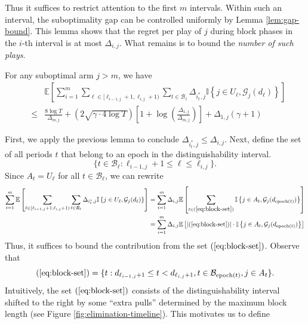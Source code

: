 \documentclass[opre,blindrev]{informs3}
\newcommand{\epoch}{\operatorname{epoch}}
\newcommand{\ind}[1]{\mathbb{I}\left\{#1\right\}}
\newcommand{\bE}[1]{{\mathbb{E}\left[#1\right]}}
\begin{document}
\begin{APPENDICES}
Thus it suffices to restrict attention to the first \(m\) intervals. 
Within such an interval, the suboptimality gap can be controlled uniformly by Lemma \ref{lem:gap-bound}. This lemma shows that the regret per play of \(j\) during block phases in the \(i\)-th interval is at most \(\Delta_{i,j}\). 
What remains is to bound the \emph{number of such plays}. 

\begin{lemma}\label{lem:B-final}
    For any suboptimal arm \(j > m\), we have
    \begin{eqnarray*}
        &&\bE{\sum_{i=1}^m \sum_{\ell \in [\ell_{i-1,j}+1, \ell_{i,j}+1)}\sum_{t \in \mathcal{B}_\ell}\Delta_{i^*_t,j}\ind{j \in U_{\ell}, \mathcal{G}_j(d_\ell)}}
        \\
        &\leq& \frac{8\log T}{\Delta_{m,j}}+\left(2\sqrt{\gamma \cdot 4\log T}\right)\left[1+\log\left(\frac{\Delta_{1,j}}{\Delta_{m,j}}\right)\right] + \Delta_{1,j}(\gamma + 1)
    \end{eqnarray*}
\end{lemma}
    First, we apply the previous lemma to conclude \(\Delta_{i^*_t,j}\leq \Delta_{i,j}\). Next, define the set of all periods \(t\) that belong to an epoch in the distinguishability interval.
    \begin{equation}\label{eq:block-set}
        \{t \in \mathcal{B}_\ell : \ell_{i-1,j}+1 \leq \ell \leq \ell_{i,j}\}.
    \end{equation}
    Since \(A_t = U_\ell\) for all \(t \in \mathcal{B}_\ell\), we can rewrite
    \begin{align*}
        \sum_{i=1}^m\bE{\sum_{\ell \in [\ell_{i-1,j}+1, \ell_{i,j}+1)}\sum_{t \in \mathcal{B}_\ell}\Delta_{i^*_t,j}\ind{j \in U_\ell, \mathcal{G}_j(d_\ell)}}
        &= \sum_{i=1}^m\Delta_{i,j}\bE{\sum_{t \in (\ref{eq:block-set})}\ind{j \in A_t, \mathcal{G}_j(d_{\epoch(t)})}}\\
        &=\sum_{i=1}^m\Delta_{i,j}\bE{|(\ref{eq:block-set})|\cdot \ind{j\in A_t, \mathcal{G}_j(d_{\epoch(t)})}}
    \end{align*}
    Thus, it suffices to bound the contribution from the set \((\ref{eq:block-set})\). Observe that
    \[
        (\ref{eq:block-set}) = \{t : d_{\ell_{i-1,j}+1} \leq t < d_{\ell_{i,j}+1}, t \in \mathcal{B}_{\epoch(t)}, j\in A_t\}.
    \] 
    Intuitively, the set \((\ref{eq:block-set})\) consists of the distinguishability interval shifted to the right by some ``extra pulls'' determined by the maximum block length (see Figure \ref{fig:elimination-timeline}). This motivates us to define 

\end{APPENDICES}
\end{document}
